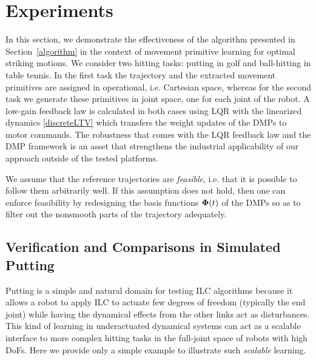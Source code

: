 \section{Experiments}\label{experiments}


In this section, we demonstrate the effectiveness of the algorithm presented in Section~\ref{algorithm} in the context of movement primitive learning for optimal striking motions. We consider two hitting tasks: putting in golf and ball-hitting in table tennis. In the first task the trajectory and the extracted movement primitives are assigned in operational, i.e. Cartesian space, whereas for the second task we generate these primitives in joint space, one for each joint of the robot. A low-gain feedback law is calculated in both cases using LQR with the linearized dynamics \eqref{discreteLTV} which transfers the weight updates of the DMPs to motor commands. The robustness that comes with the LQR feedback law and the DMP framework is an asset that strengthens the industrial applicability of our approach outside of the tested platforms.

We assume that the reference trajectories are \emph{feasible}, i.e. that it is possible to follow them arbitrarily well. If this assumption does not hold, then one can enforce feasibility by redesigning the basis functions $\boldsymbol{\mathrm{\Phi}}(t)$ of the DMPs so as to filter out the nonsmooth parts of the trajectory adequately.

\subsection{Verification and Comparisons in Simulated Putting}

Putting is a simple and natural domain for testing ILC algorithms because it allows a robot to apply ILC to actuate few degrees of freedom (typically the end joint) while having the dynamical effects from the other links act as disturbances. This kind of learning in underactuated dynamical systems can act as a scalable interface to more complex hitting tasks in the full-joint space of robots with high DoFs. Here we provide only a simple example to illustrate such \emph{scalable} learning.

